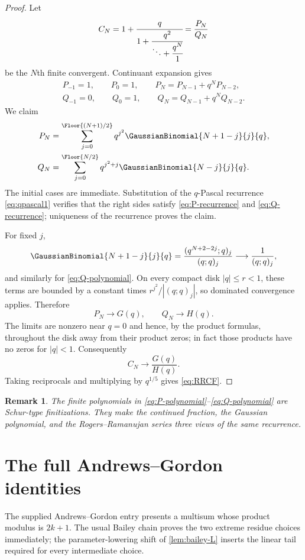 \documentclass[11pt]{article}
\theoremstyle{blueplain}
\theoremstyle{bluedef}
\newtheorem{remark}[theorem]{Remark}
\begin{document}
\begin{proof}
Let
\[
C_N=1+\cfrac{q}{1+\cfrac{q^2}{\ddots+\cfrac{q^N}{1}}}
=\frac{P_N}{Q_N}
\]
be the $N$th finite convergent.  Continuant expansion gives
\begin{align}
P_{-1}=1,\qquad P_0=1,\qquad P_N=P_{N-1}+q^NP_{N-2}, \label{eq:P-recurrence}\\
Q_{-1}=0,\qquad Q_0=1,\qquad Q_N=Q_{N-1}+q^NQ_{N-2}. \label{eq:Q-recurrence}
\end{align}
We claim
\begin{align}
P_N&=\sum_{j=0}^{\Floor{(N+1)/2}}
q^{j^2}\GaussianBinomial{N+1-j}{j}{q}, \label{eq:P-polynomial}\\
Q_N&=\sum_{j=0}^{\Floor{N/2}}
q^{j^2+j}\GaussianBinomial{N-j}{j}{q}. \label{eq:Q-polynomial}
\end{align}
The initial cases are immediate.  Substitution of the $q$-Pascal recurrence \eqref{eq:qpascal1} verifies that the right sides satisfy \eqref{eq:P-recurrence} and \eqref{eq:Q-recurrence}; uniqueness of the recurrence proves the claim.

For fixed $j$,
\[
\GaussianBinomial{N+1-j}{j}{q}
=\frac{(q^{N+2-2j};q)_j}{(q;q)_j}\longrightarrow\frac1{(q;q)_j},
\]
and similarly for \eqref{eq:Q-polynomial}.  On every compact disk $|q|\le r<1$, these terms are bounded by a constant times $r^{j^2}/|(q;q)_j|$, so dominated convergence applies.  Therefore
\[
P_N\longrightarrow G(q),
\qquad
Q_N\longrightarrow H(q).
\]
The limits are nonzero near $q=0$ and hence, by the product formulas, throughout the disk away from their product zeros; in fact those products have no zeros for $|q|<1$.  Consequently
\[
C_N\longrightarrow\frac{G(q)}{H(q)}.
\]
Taking reciprocals and multiplying by $q^{1/5}$ gives \eqref{eq:RRCF}.
\end{proof}

\begin{remark}
The finite polynomials in \eqref{eq:P-polynomial}--\eqref{eq:Q-polynomial} are Schur-type finitizations.  They make the continued fraction, the Gaussian polynomial, and the Rogers--Ramanujan series three views of the same recurrence.
\end{remark}

\section{The full Andrews--Gordon identities}

The supplied Andrews--Gordon entry presents a multisum whose product modulus is $2k+1$.  The usual Bailey chain proves the two extreme residue choices immediately; the parameter-lowering shift of \cref{lem:bailey-L} inserts the linear tail required for every intermediate choice.
\end{document}
